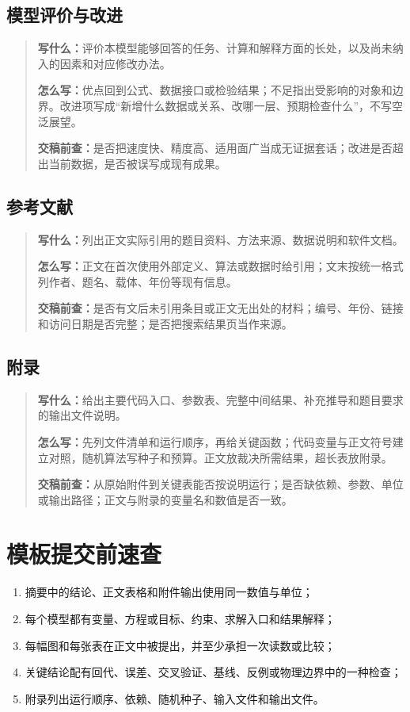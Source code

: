\documentclass[UTF8,zihao=-4]{ctexart}
\newenvironment{writeguide}
  {\begin{quote}\small\color{black}}
  {\end{quote}}
\newcommand{\guideitem}[2]{%
  \par\noindent\textbf{\color{inkblue}#1：}\ignorespaces #2\par
}
\begin{document}
\subsection{模型评价与改进}
\begin{writeguide}
\guideitem{写什么}{评价本模型能够回答的任务、计算和解释方面的长处，以及尚未纳入的因素和对应修改办法。}
\guideitem{怎么写}{优点回到公式、数据接口或检验结果；不足指出受影响的对象和边界。改进项写成“新增什么数据或关系、改哪一层、预期检查什么”，不写空泛展望。}
\guideitem{交稿前查}{是否把速度快、精度高、适用面广当成无证据套话；改进是否超出当前数据，是否被误写成现有成果。}
\end{writeguide}

\subsection{参考文献}
\begin{writeguide}
\guideitem{写什么}{列出正文实际引用的题目资料、方法来源、数据说明和软件文档。}
\guideitem{怎么写}{正文在首次使用外部定义、算法或数据时给引用；文末按统一格式列作者、题名、载体、年份等现有信息。}
\guideitem{交稿前查}{是否有文后未引用条目或正文无出处的材料；编号、年份、链接和访问日期是否完整；是否把搜索结果页当作来源。}
\end{writeguide}

\subsection{附录}
\begin{writeguide}
\guideitem{写什么}{给出主要代码入口、参数表、完整中间结果、补充推导和题目要求的输出文件说明。}
\guideitem{怎么写}{先列文件清单和运行顺序，再给关键函数；代码变量与正文符号建立对照，随机算法写种子和预算。正文放裁决所需结果，超长表放附录。}
\guideitem{交稿前查}{从原始附件到关键表能否按说明运行；是否缺依赖、参数、单位或输出路径；正文与附录的变量名和数值是否一致。}
\end{writeguide}

\appendix
\section{模板提交前速查}

\begin{enumerate}
  \item 摘要中的结论、正文表格和附件输出使用同一数值与单位；
  \item 每个模型都有变量、方程或目标、约束、求解入口和结果解释；
  \item 每幅图和每张表在正文中被提出，并至少承担一次读数或比较；
  \item 关键结论配有回代、误差、交叉验证、基线、反例或物理边界中的一种检查；
  \item 附录列出运行顺序、依赖、随机种子、输入文件和输出文件。
\end{enumerate}
\end{document}

